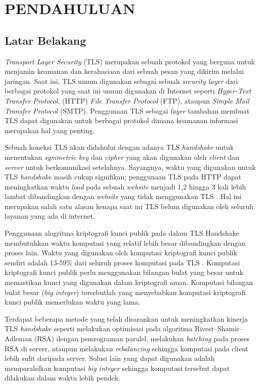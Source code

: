 \chapter{PENDAHULUAN}


\section{Latar Belakang}
  \textit{Transport Layer Security} (TLS) merupakan sebuah protokol yang berguna untuk menjamin keamanan dan kerahasiaan dari sebuah pesan yang dikirim melalui jaringan. Saat ini, TLS umum digunakan sebagai sebuah \textit{security layer} dari berbagai protokol yang saat ini umum digunakan di Internet seperti \textit{Hyper-Text Transfer Protocol}, (HTTP) \textit{File Transfer Protocol} (FTP), ataupun \textit{Simple Mail Transfer Protocol} (SMTP). Penggunaan TLS sebagai \textit{layer} tambahan membuat TLS dapat digunakan untuk berbagai protokol dimana keamanan informasi merupakan hal yang penting.

  Sebuah koneksi TLS akan didahului dengan adanya TLS \textit{handshake} untuk menentukan \textit{symmetric key} dan \textit{cipher} yang akan digunakan oleh \textit{client} dan \textit{server} untuk berkomunikasi setelahnya. Sayangnya, waktu yang digunakan untuk TLS \textit{handshake} masih cukup signifikan; penggunaan TLS pada HTTP dapat meningkatkan waktu \textit{load} pada sebuah \textit{website} menjadi 1,2 hingga 3 kali lebih lambat dibandingkan dengan \textit{website} yang tidak menggunakan TLS \citep{cost_of_s}. Hal ini merupakan salah satu alasan kenapa saat ini TLS belum digunakan oleh seluruh layanan yang ada di internet.

  Penggunaan alogritma kriptografi kunci publik pada dalam TLS Handshake membutuhkan waktu komputasi yang relatif lebih besar dibandingkan dengan proses lain. Waktu yang digunakan oleh komputasi kriptografi kunci publik sendiri adalah 13-59\% dari seluruh proses komputasi pada TLS \citep{perf_tls}. Komputasi kriptografi kunci publik perlu menggunakan bilangan bulat yang besar untuk memastikan kunci yang digunakan dalam kriptografi aman. Komputasi bilangan bulat besar (\textit{big integer}) tersebutlah yang menyebabkan komputasi kriptografi kunci publik  memerlukan waktu yang lama.

  Terdapat beberapa metode yang telah disarankan untuk meningkatkan kinerja TLS \textit{handshake} seperti melakukan optimisasi pada algoritma Rivest–Shamir–Adleman (RSA) dengan pemrograman paralel, melakukan \textit{batching} pada proses RSA di server, ataupun melakukan \textit{rebalancing} sehingga komputasi pada client lebih sulit daripada server. Solusi lain yang dapat digunakan adalah memparalelkan komputasi \textit{big integer} sehingga komputasi tersebut dapat dilakukan dalam waktu lebih pendek.

